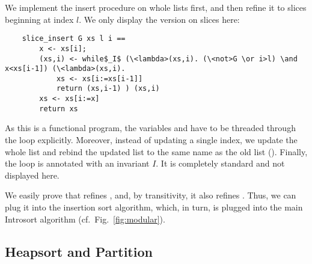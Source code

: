 \documentclass[sigplan,10pt,anonymous,review]{acmart}\settopmatter{printfolios=true,printccs=false,printacmref=false}
\theoremstyle{definition}
\begin{document}
  We implement the insert procedure on whole lists first, and then refine it to slices beginning at index \is$l$.
  We only display the version on slices here:
  \begin{lstlisting}
    slice_insert G xs l i ==
        x <- xs[i];
        (xs,i) <- while$_I$ (\<lambda>(xs,i). (\<not>G \or i>l) \and x<xs[i-1]) (\<lambda>(xs,i).
            xs <- xs[i:=xs[i-1]]
            return (xs,i-1) ) (xs,i)
        xs <- xs[i:=x]
        return xs
  \end{lstlisting}
%
%
%
%
%
  As this is a functional program, the variables  and  have to be threaded through the loop explicitly.
  Moreover, instead of updating a single index, we update the whole list and rebind the updated list to the same name as
  the old list (). Finally, the loop is annotated with an invariant $I$. It is completely standard
  and not displayed here.

  We easily prove that  refines , and, by transitivity,
  it also refines . Thus, we can plug it into the insertion sort algorithm, which, in turn, is plugged into the main Introsort algorithm (cf.\ Fig.~\ref{fig:modular}).


\subsection{Heapsort and Partition}
  \newcommand{\leftc}{\textrm{left}}
  \newcommand{\rightc}{\textrm{right}}
\end{document}
